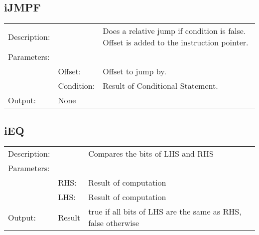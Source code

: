 \subsection{iJMPF}
\begin{tabular}{l l p{10cm}}
Description: & ~    & Does a relative jump if condition is false. Offset is added to the instruction pointer.\\
Parameters:  & ~ & ~                                                                                   \\
~			 & Offset: & Offset to jump by.\\
~			 & Condition: & Result of Conditional Statement.\\
Output:      & None & ~                                                                                   \\
\end{tabular}

\subsection{iEQ}
\begin{tabular}{l l p{10cm}}
Description: & ~    & Compares the bits of LHS and RHS\\
Parameters:  & ~ & ~                                                                                   \\
~			 & RHS: & Result of computation\\
~			 & LHS: & Result of computation\\
Output:      & Result & true if all bits of LHS are the same as RHS, false otherwise                        \\
\end{tabular}